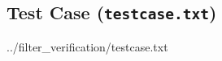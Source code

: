 \documentclass[12pt]{article}
\newcommand{\TextListing}{}
\begin{document}
\subsection{Test Case (\texttt{testcase.txt})}
\TextListing{../filter_verification/testcase.txt}
\label{lst:testcase.txt}






\fi
\end{document}
